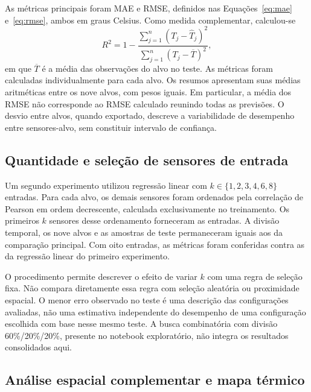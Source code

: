 As métricas principais foram MAE e RMSE, definidos nas
Equações~\ref{eq:mae} e~\ref{eq:rmse}, ambos em graus Celsius.
Como medida complementar, calculou-se
\begin{equation}
    R^2=1-\frac{\sum_{j=1}^{n}(T_j-\widehat{T}_j)^2}
                     {\sum_{j=1}^{n}(T_j-\overline{T})^2},
    \label{eq:r2}
\end{equation}
em que $\overline{T}$ é a média das observações do alvo no teste.
As métricas foram calculadas individualmente para cada alvo.
Os resumos apresentam suas médias aritméticas entre os nove alvos,
com pesos iguais. Em particular, a média dos RMSE não corresponde
ao RMSE calculado reunindo todas as previsões. O desvio entre alvos, quando exportado, descreve a variabilidade de desempenho entre sensores-alvo, sem constituir intervalo de confiança.

\subsection{Quantidade e seleção de sensores de entrada}
\label{subsec:quantidade_sensores}

Um segundo experimento utilizou regressão linear com
$k\in\{1,2,3,4,6,8\}$ entradas. Para cada alvo, os demais sensores
foram ordenados pela correlação de Pearson em ordem decrescente,
calculada exclusivamente no treinamento. Os primeiros $k$ sensores
desse ordenamento forneceram as entradas. A divisão temporal, os
nove alvos e as amostras de teste permaneceram iguais aos da
comparação principal. Com oito entradas, as métricas foram conferidas
contra as da regressão linear do primeiro experimento.

O procedimento permite descrever o efeito de variar $k$ com uma
regra de seleção fixa. Não compara diretamente essa regra com
seleção aleatória ou proximidade espacial. O menor erro observado
no teste é uma descrição das configurações avaliadas, não uma
estimativa independente do desempenho de uma configuração escolhida
com base nesse mesmo teste. A busca combinatória com divisão
60\%/20\%/20\%, presente no notebook exploratório, não integra
os resultados consolidados aqui.

\subsection{Análise espacial complementar e mapa térmico}
\label{subsec:metodologia_espacial}


